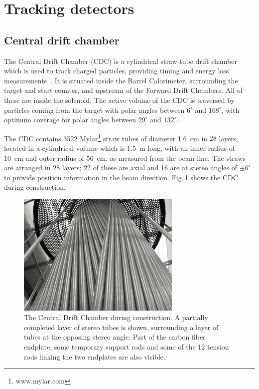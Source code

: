 \section{Tracking detectors \label{sec:tracking}}
\subsection[Central drift chamber (Naomi)]{Central drift chamber \label{sec:cdc}}

The Central Drift Chamber (CDC) is a cylindrical straw-tube drift chamber which is used to track charged particles, providing timing and energy loss measurements~\cite{GlueXCDCNIM}.
It is situated inside the Barrel Calorimeter, surrounding the target and start counter, and upstream of the Forward Drift Chambers. 
All of these are inside the solenoid. 
The active volume of the CDC is traversed
by particles coming from the target with polar angles between $6^{\circ}$ and $168^{\circ}$, with optimum 
coverage for polar angles between $29^{\circ}$ and $132^{\circ}$.  

The CDC contains 3522 Mylar\footnote{www.mylar.com} straw tubes of diameter 1.6~cm in $28$ layers,
located in a cylindrical volume which is 1.5~m long, with an inner radius of 10~cm and outer radius of 56~cm, as measured from the beam-line.  
The straws are arranged in 28 layers; 22 of these are axial and 16 are at stereo angles of $\pm 6^{\circ}$ to provide position information in the beam direction. Fig.\,\ref{fig:CDC_stereotubes}  shows the CDC during construction. 

\begin{figure}[tbp]
\begin{center}
\includegraphics[width=0.7\textwidth]{figures/CDC_stereotubes}  
\caption{\label{fig:CDC_stereotubes}          
  The Central Drift Chamber during construction. A partially completed layer of stereo tubes is shown, surrounding a layer of tubes at the opposing stereo angle. Part of the carbon fiber endplate, some temporary support rods and some of the 12 tension rods linking the two endplates are also visible. 
}   
\end{center}  
\end{figure}

